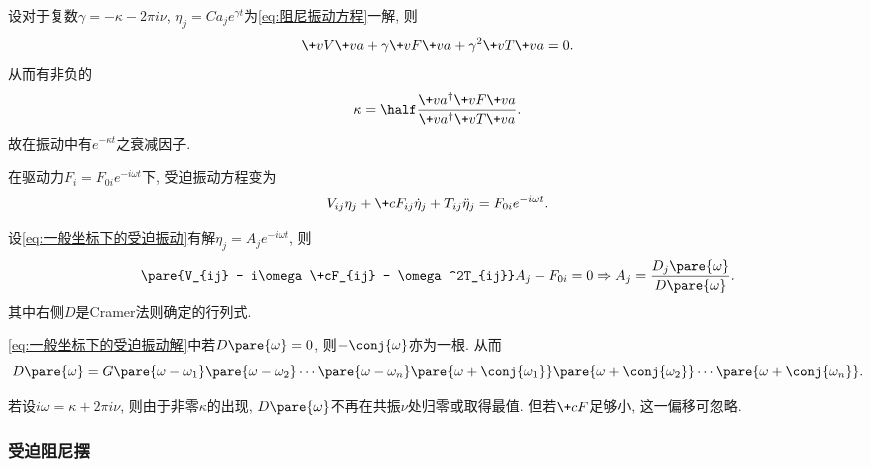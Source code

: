 \documentclass[../TheoreticalMechanics.tex]{subfiles}
\begin{document}
\begin{lemma}[一般坐标下的阻尼振动]
    设对于复数$\gamma = -\kappa - 2\pi i \nu$, $\eta_j = Ca_je^{\gamma t}$为\eqref{eq:阻尼振动方程}一解, 则
    \[ \+vV\+va + \gamma\+vF\+va + \gamma^2\+vT\+va = 0. \]
    从而有非负的
    \[ \kappa = \half \frac{\+va^\dagger\+vF\+va}{\+va^\dagger\+vT\+va}. \]
    故在振动中有$e^{-\kappa t}$之衰减因子.
\end{lemma}
\begin{lemma}[一般坐标下的受迫振动]
    在驱动力$F_i = F_{0i}e^{-i\omega t}$下, 受迫振动方程变为
    \begin{equation}
        \label{eq:一般坐标下的受迫振动}
        V_{ij}\eta_j + \+cF_{ij}\dot{\eta}_j + T_{ij}\ddot{\eta}_j = F_{0i}e^{-i\omega t}. 
    \end{equation}
\end{lemma}
\begin{finale}
    \begin{theorem}[一般坐标下的受迫振动解]
        设\eqref{eq:一般坐标下的受迫振动}有解$\eta_j = A_je^{-i\omega t}$, 则
        \begin{equation}
            \label{eq:一般坐标下的受迫振动解}
            \pare{V_{ij} - i\omega\+cF_{ij} - \omega^2T_{ij}}A_j - F_{0i} = 0\Rightarrow A_j = \frac{D_j\pare{\omega}}{D\pare{\omega}}. 
        \end{equation}
        其中右侧$D$是Cramer法则确定的行列式.
    \end{theorem}
\end{finale}

\begin{lemma}[伴随振动频率]
    \eqref{eq:一般坐标下的受迫振动解}中若$D\pare{\omega}=0$, 则$-\conj{\omega}$亦为一根. 从而
    \[ D\pare{\omega} = G\pare{\omega - \omega_1}\pare{\omega - \omega_2} \cdots \pare{\omega - \omega_n}\pare{\omega + \conj{\omega_1}}\pare{\omega + \conj{\omega_2}}\cdots\pare{\omega + \conj{\omega_n}}. \]
\end{lemma}
\begin{remark}
    若设$i\omega = \kappa + 2\pi i\nu$, 则由于非零$\kappa$的出现, $D\pare{\omega}$不再在共振$\nu$处归零或取得最值. 但若$\+cF$足够小, 这一偏移可忽略.
\end{remark}


\subsubsection{受迫阻尼摆} %
\label{ssub:受迫阻尼摆}
\end{document}
